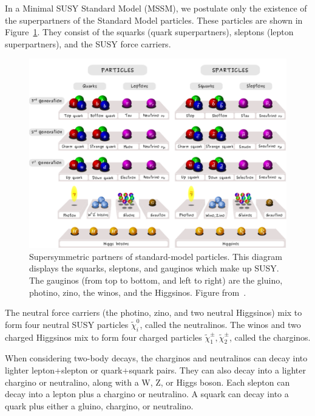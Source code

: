 In a Minimal SUSY Standard Model (MSSM), we postulate only the existence of the superpartners of the Standard Model particles. These particles are shown in Figure~\ref{fig:SUSY_particles}. They consist of the squarks (quark superpartners), sleptons (lepton superpartners), and the SUSY force carriers.

\begin{figure}[htbp]
    \centering
    \includegraphics[width=\textwidth]{Images/Background/SUSY_particles.png}
    \caption{Supersymmetric partners of standard-model particles. This diagram displays the squarks, sleptons, and gauginos which make up SUSY. The gauginos (from top to bottom, and left to right) are the gluino, photino, zino, the winos, and the Higgsinos. Figure from~\cite{SUSY_particles}.}
    \label{fig:SUSY_particles}
\end{figure}

The neutral force carriers (the photino, zino, and two neutral Higgsinos) mix to form four neutral SUSY particles $\tilde{\chi}^0_i$, called the neutralinos. The winos and two charged Higgsinos mix to form four charged particles $\tilde{\chi}^\pm_1, \tilde{\chi}^\pm_2$, called the charginos.

When considering two-body decays, the charginos and neutralinos can decay into lighter lepton+slepton or quark+squark pairs. They can also decay into a lighter chargino or neutralino, along with a W, Z, or Higgs boson. Each slepton can decay into a lepton plus a chargino or neutralino. A squark can decay into a quark plus either a gluino, chargino, or neutralino.